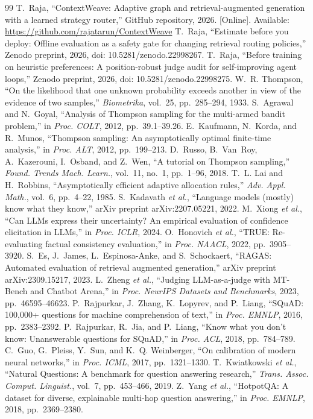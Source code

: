 \documentclass[conference]{IEEEtran}
\theoremstyle{definition}
\theoremstyle{remark}
\begin{document}
\begin{thebibliography}{99}
 T.~Raja, ``ContextWeave: Adaptive graph and retrieval-augmented generation with a learned strategy router,'' GitHub repository, 2026. [Online]. Available: \url{https://github.com/rajatarun/ContextWeave}
 T.~Raja, ``Estimate before you deploy: Offline evaluation as a safety gate for changing retrieval routing policies,'' Zenodo preprint, 2026, doi: 10.5281/zenodo.22998267.
 T.~Raja, ``Before training on heuristic preferences: A position-robust judge audit for self-improving agent loops,'' Zenodo preprint, 2026, doi: 10.5281/zenodo.22998275.
 W.~R. Thompson, ``On the likelihood that one unknown probability exceeds another in view of the evidence of two samples,'' \emph{Biometrika}, vol.~25, pp.~285--294, 1933.
 S.~Agrawal and N.~Goyal, ``Analysis of Thompson sampling for the multi-armed bandit problem,'' in \emph{Proc. COLT}, 2012, pp.~39.1--39.26.
 E.~Kaufmann, N.~Korda, and R.~Munos, ``Thompson sampling: An asymptotically optimal finite-time analysis,'' in \emph{Proc. ALT}, 2012, pp.~199--213.
 D.~Russo, B.~Van~Roy, A.~Kazerouni, I.~Osband, and Z.~Wen, ``A tutorial on Thompson sampling,'' \emph{Found. Trends Mach. Learn.}, vol.~11, no.~1, pp.~1--96, 2018.
 T.~L. Lai and H.~Robbins, ``Asymptotically efficient adaptive allocation rules,'' \emph{Adv. Appl. Math.}, vol.~6, pp.~4--22, 1985.
 S.~Kadavath \emph{et al.}, ``Language models (mostly) know what they know,'' arXiv preprint arXiv:2207.05221, 2022.
 M.~Xiong \emph{et al.}, ``Can LLMs express their uncertainty? An empirical evaluation of confidence elicitation in LLMs,'' in \emph{Proc. ICLR}, 2024.
 O.~Honovich \emph{et al.}, ``TRUE: Re-evaluating factual consistency evaluation,'' in \emph{Proc. NAACL}, 2022, pp.~3905--3920.
 S.~Es, J.~James, L.~Espinosa-Anke, and S.~Schockaert, ``RAGAS: Automated evaluation of retrieval augmented generation,'' arXiv preprint arXiv:2309.15217, 2023.
 L.~Zheng \emph{et al.}, ``Judging LLM-as-a-judge with MT-Bench and Chatbot Arena,'' in \emph{Proc. NeurIPS Datasets and Benchmarks}, 2023, pp.~46595--46623.
 P.~Rajpurkar, J.~Zhang, K.~Lopyrev, and P.~Liang, ``SQuAD: 100,000+ questions for machine comprehension of text,'' in \emph{Proc. EMNLP}, 2016, pp.~2383--2392.
 P.~Rajpurkar, R.~Jia, and P.~Liang, ``Know what you don't know: Unanswerable questions for SQuAD,'' in \emph{Proc. ACL}, 2018, pp.~784--789.
 C.~Guo, G.~Pleiss, Y.~Sun, and K.~Q. Weinberger, ``On calibration of modern neural networks,'' in \emph{Proc. ICML}, 2017, pp.~1321--1330.
 T.~Kwiatkowski \emph{et al.}, ``Natural Questions: A benchmark for question answering research,'' \emph{Trans. Assoc. Comput. Linguist.}, vol.~7, pp.~453--466, 2019.
 Z.~Yang \emph{et al.}, ``HotpotQA: A dataset for diverse, explainable multi-hop question answering,'' in \emph{Proc. EMNLP}, 2018, pp.~2369--2380.
\end{thebibliography}
\end{document}
